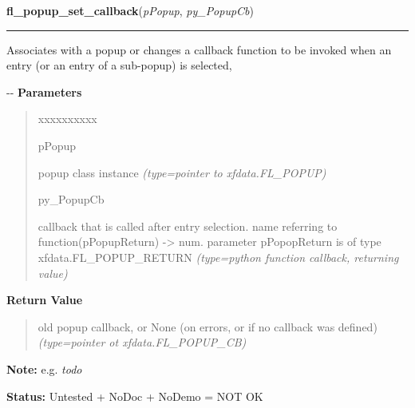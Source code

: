     \vspace{0.5ex}

\hspace{.8\funcindent}\begin{boxedminipage}{\funcwidth}

    \raggedright \textbf{fl\_popup\_set\_callback}(\textit{pPopup}, \textit{py\_PopupCb})

    \vspace{-1.5ex}

    \rule{\textwidth}{0.5\fboxrule}
\setlength{\parskip}{2ex}

Associates with a popup or changes a callback function to be invoked
when an entry (or an entry of a sub-popup) is selected,

-{}-
\setlength{\parskip}{1ex}
      \textbf{Parameters}
      \vspace{-1ex}

      \begin{quote}
        \begin{Ventry}{xxxxxxxxxx}

          \item[pPopup]


popup class instance
            {\it (type=pointer to xfdata.FL\_POPUP)}

          \item[py\_PopupCb]


callback that is called after entry selection.
name referring to function(pPopupReturn) -> num.
parameter pPopopReturn is of type xfdata.FL\_POPUP\_RETURN
            {\it (type=python function callback, returning value)}

        \end{Ventry}

      \end{quote}

      \textbf{Return Value}
    \vspace{-1ex}

      \begin{quote}

old popup callback, or None (on errors, or if no callback was
defined)
      {\it (type=pointer ot xfdata.FL\_POPUP\_CB)}

      \end{quote}

\textbf{Note:} 
e.g. \emph{todo}


\textbf{Status:} 
Untested + NoDoc + NoDemo = NOT OK


    \end{boxedminipage}

